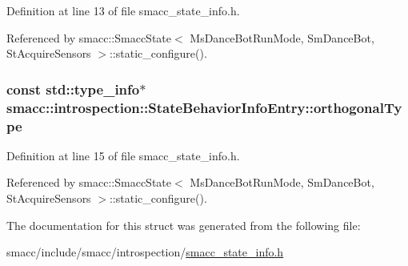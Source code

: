 Definition at line 13 of file smacc\+\_\+state\+\_\+info.\+h.



Referenced by smacc\+::\+Smacc\+State$<$ Ms\+Dance\+Bot\+Run\+Mode, Sm\+Dance\+Bot, St\+Acquire\+Sensors $>$\+::static\+\_\+configure().

\subsubsection[{\texorpdfstring{orthogonal\+Type}{orthogonalType}}]{\setlength{\rightskip}{0pt plus 5cm}const std\+::type\+\_\+info$\ast$ smacc\+::introspection\+::\+State\+Behavior\+Info\+Entry\+::orthogonal\+Type}\hypertarget{structsmacc_1_1introspection_1_1StateBehaviorInfoEntry_aafb02bbfd8a479d586039b3971dfe7e0}{}\label{structsmacc_1_1introspection_1_1StateBehaviorInfoEntry_aafb02bbfd8a479d586039b3971dfe7e0}


Definition at line 15 of file smacc\+\_\+state\+\_\+info.\+h.



Referenced by smacc\+::\+Smacc\+State$<$ Ms\+Dance\+Bot\+Run\+Mode, Sm\+Dance\+Bot, St\+Acquire\+Sensors $>$\+::static\+\_\+configure().



The documentation for this struct was generated from the following file\+:\begin{DoxyCompactItemize}
\item 
smacc/include/smacc/introspection/\hyperlink{smacc__state__info_8h}{smacc\+\_\+state\+\_\+info.\+h}\end{DoxyCompactItemize}
